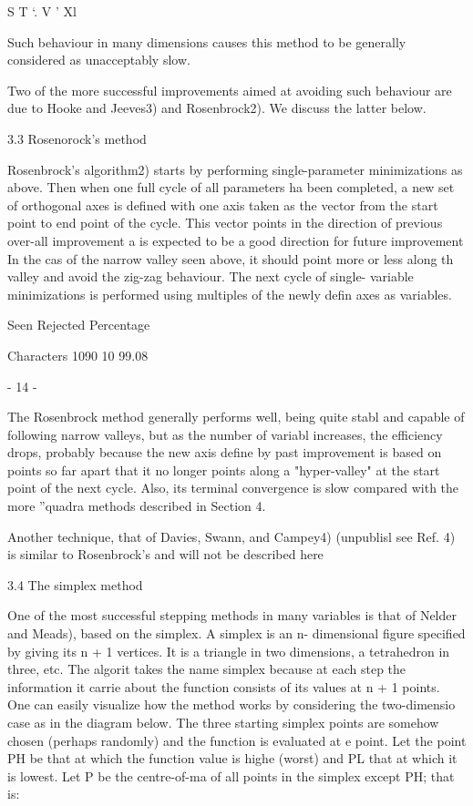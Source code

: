  
 
 
 
 
 
 
 
 
                     S T `. V                '
                                              Xl
 
 
 
Such behaviour in many dimensions causes this method to be generally
considered as unacceptably slow.
 
     Two of the more successful improvements aimed at avoiding such
behaviour are due to Hooke and Jeeves3) and Rosenbrock2).  We discuss
the latter below.
 
 
3.3  Rosenorock's method
 
     Rosenbrock's algorithm2) starts by performing single-parameter
minimizations as above.  Then when one full cycle of all parameters ha
been completed, a new set of orthogonal axes is defined with one axis
taken as the vector from the start point to end point of the cycle.
This vector points in the direction of previous over-all improvement a
is expected to be a good direction for future improvement  In the cas
of the narrow valley seen above, it should point more or less along th
valley and avoid the zig-zag behaviour.  The next cycle of single-
variable minimizations is performed using multiples of the newly defin
axes as variables.
 
                 Seen Rejected  Percentage
 
Characters       1090       10   99.08
 
                                - 14 -
 
 
 
     The Rosenbrock method generally performs well, being quite stabl
and capable of following narrow valleys, but as the number of variabl
increases, the efficiency drops, probably because the new axis define
by past improvement is based on points so far apart that it no longer
points along a "hyper-valley" at the start point of the next cycle.
Also, its terminal convergence is slow compared with the more ''quadra
methods described in Section 4.
 
     Another technique, that of Davies, Swann, and Campey4) (unpublisl
see Ref. 4) is similar to Rosenbrock's and will not be described here
 
 
3.4  The simplex method
 
     One of the most successful stepping methods in many variables is
that of Nelder and Meads), based on the simplex.  A simplex is an n-
dimensional figure specified by giving its n + 1 vertices.  It is a
triangle in two dimensions, a tetrahedron in three, etc.  The algorit
takes the name simplex because at each step the information it carrie
about the function consists of its values at n + 1 points.  One can
easily visualize how the method works by considering the two-dimensio
case as in the diagram below.  The three starting simplex points are
somehow  chosen (perhaps randomly) and the function is evaluated at e
point.  Let the point PH be that at which the function value is highe
(worst) and PL that at which it is lowest.  Let P be the centre-of-ma
of all points in the simplex except PH;  that is:
 

